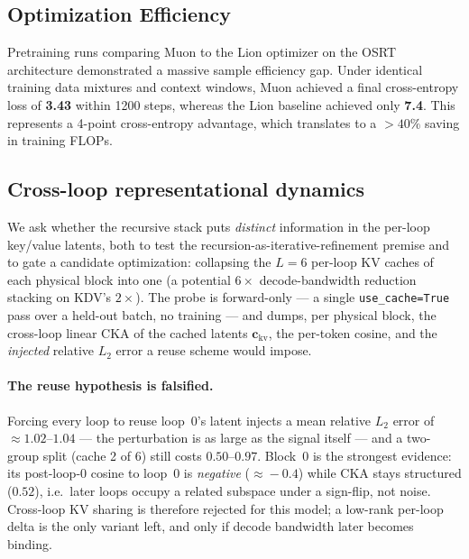 \documentclass[11pt,twocolumn]{article}
\begin{document}
\subsection{Optimization Efficiency}
Pretraining runs comparing Muon to the Lion optimizer on the OSRT architecture demonstrated a massive sample efficiency gap. Under identical training data mixtures and context windows, Muon achieved a final cross-entropy loss of \textbf{3.43} within 1200 steps, whereas the Lion baseline achieved only \textbf{7.4}. This represents a 4-point cross-entropy advantage, which translates to a $>40\%$ saving in training FLOPs.

\subsection{Cross-loop representational dynamics}

We ask whether the recursive stack puts \emph{distinct} information in the
per-loop key/value latents, both to test the recursion-as-iterative-refinement
premise and to gate a candidate optimization: collapsing the $L{=}6$ per-loop KV
caches of each physical block into one (a potential $6\times$ decode-bandwidth
reduction stacking on KDV's $2\times$). The probe is forward-only --- a single
\texttt{use\_cache=True} pass over a held-out batch, no training --- and dumps,
per physical block, the cross-loop linear CKA of the cached latents
$\mathbf{c}_{\text{kv}}$, the per-token cosine, and the \emph{injected} relative
$L_2$ error a reuse scheme would impose.

\paragraph{The reuse hypothesis is falsified.} Forcing every loop to reuse
loop~0's latent injects a mean relative $L_2$ error of $\approx\!1.02\text{--}1.04$
--- the perturbation is as large as the signal itself --- and a two-group split
(cache 2 of 6) still costs $0.50\text{--}0.97$. Block~0 is the strongest evidence:
its post-loop-0 cosine to loop~0 is \emph{negative} ($\approx\!-0.4$) while CKA
stays structured ($0.52$), i.e.\ later loops occupy a related subspace under a
sign-flip, not noise. Cross-loop KV sharing is therefore rejected for this model;
a low-rank per-loop delta is the only variant left, and only if decode bandwidth
later becomes binding.
\end{document}
